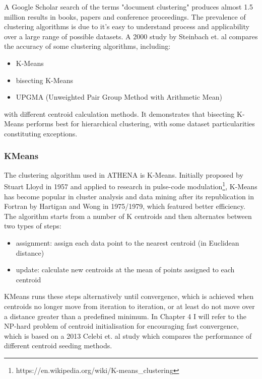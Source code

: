 A Google Scholar search of the terms "document clustering" produces almost 1.5 million results in books, papers and conference proceedings. The prevalence of clustering algorithms is due to it's easy to understand process and applicability over a large range of possible datasets. A 2000 study by Steinbach et. al \cite{steinbach2000comparison} compares the accuracy of some clustering algorithms, including:

\begin{itemize}
\item K-Means
\item bisecting K-Means
\item UPGMA (Unweighted Pair Group Method with Arithmetic Mean)
\end{itemize}

with different centroid calculation methods. It demonstrates that bisecting K-Means performs best for hierarchical clustering, with some dataset particularities constituting exceptions.

\subsubsection{KMeans}
The clustering algorithm used in ATHENA is K-Means. Initially proposed by Stuart Lloyd in 1957 and applied to research in pulse-code modulation\footnote{https://en.wikipedia.org/wiki/K-means\_clustering}, K-Means has become popular in cluster analysis and data mining after its republication in Fortran by Hartigan and Wong in 1975/1979, which featured better efficiency. The algorithm starts from a number of K centroids and then alternates between two types of steps:

\begin{itemize}
\item assignment: assign each data point to the nearest centroid (in Euclidean distance)
\item update: calculate new centroids at the mean of points assigned to each centroid
\end{itemize}

KMeans runs these steps alternatively until convergence, which is achieved when centroids no longer move from iteration to iteration, or at least do not move over a distance greater than a predefined minimum. In Chapter 4 I will refer to the NP-hard problem of centroid initialisation for encouraging fast convergence, which is based on a 2013 Celebi et. al study \cite{celebi2013comparative} which compares the performance of different centroid seeding methods.

